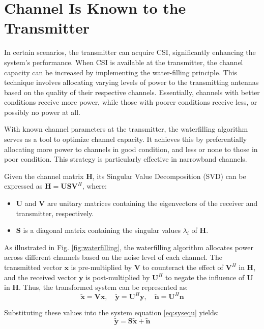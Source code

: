 \documentclass[lettersize,journal]{IEEEtran}
\begin{document}
\section{Channel Is Known to the Transmitter}
In certain scenarios, the transmitter can acquire CSI, significantly enhancing the system's performance. When CSI is available at the transmitter, the channel capacity can be increased by implementing the water-filling principle. This technique involves allocating varying levels of power to the transmitting antennas based on the quality of their respective channels. Essentially, channels with better conditions receive more power, while those with poorer conditions receive less, or possibly no power at all.

With known channel parameters at the transmitter, the waterfilling algorithm serves as a tool to optimize channel capacity. It achieves this by preferentially allocating more power to channels in good condition, and less or none to those in poor condition. This strategy is particularly effective in narrowband channels.

Given the channel matrix \( \mathbf{H} \), its Singular Value Decomposition (SVD) can be expressed as \( \mathbf{H} = \mathbf{USV}^H \)\cite{lebrun2005mimo}, where:
\begin{itemize}
    \item \( \mathbf{U} \) and \( \mathbf{V} \) are unitary matrices containing the eigenvectors of the receiver and transmitter, respectively.
    \item \( \mathbf{S} \) is a diagonal matrix containing the singular values \( \lambda_i \) of \( \mathbf{H} \).
\end{itemize}

As illustrated in Fig. \ref{fig:waterfilling}, the waterfilling algorithm allocates power across different channels based on the noise level of each channel. The transmitted vector \( \mathbf{x} \) is pre-multiplied by \( \mathbf{V} \) to counteract the effect of \( \mathbf{V}^H \) in \( \mathbf{H} \), and the received vector \( \mathbf{y} \) is post-multiplied by \( \mathbf{U}^H \) to negate the influence of \( \mathbf{U} \) in \( \mathbf{H} \). Thus, the transformed system can be represented as:
\begin{equation}
\mathbf{\tilde{x}} = \mathbf{Vx}, \quad \mathbf{\tilde{y}} = \mathbf{U}^H\mathbf{y}, \quad \mathbf{\tilde{n}} = \mathbf{U}^H\mathbf{n}
\end{equation}

Substituting these values into the system equation \eqref{eq:sysequ} yields:
\begin{equation}
\mathbf{\tilde{y}} = \mathbf{S\tilde{x}} + \mathbf{\tilde{n}}
\end{equation}
\end{document}
